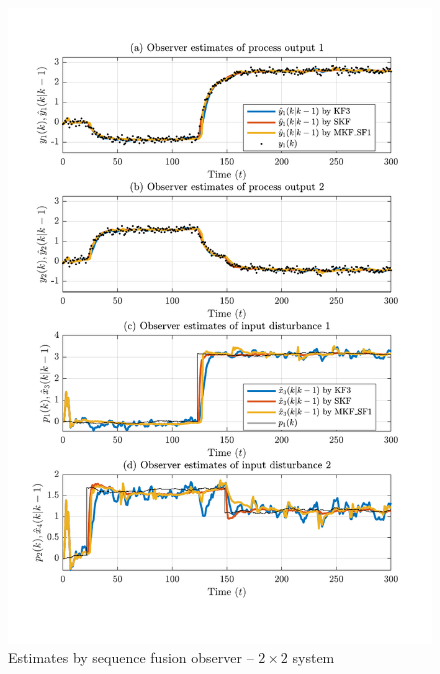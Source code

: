 \begin{figure}[htp]
	\centering
	\includegraphics[width=12cm]{images/rod_obs_sim2_all_seed_y_est1_SF1.pdf}
	\caption{Estimates by sequence fusion observer –  $2\times2$ system}
	\label{fig:rod-obs-sim2-yest-1-SF}
\end{figure}

